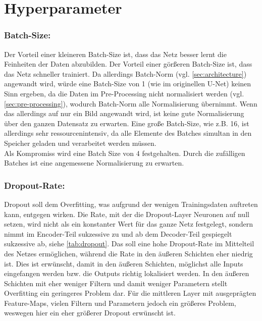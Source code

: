 \section{Hyperparameter}

\subsubsection{Batch-Size:}

Der Vorteil einer kleineren Batch-Size ist, dass das Netz besser lernt die Feinheiten der Daten abzubilden. 
Der Vorteil einer görßeren Batch-Size ist, dass das Netz schneller trainiert. 
Da allerdings Batch-Norm (vgl. \autoref{sec:architecture}) angewandt wird, würde eine Batch-Size von 1 (wie im originellen U-Net) keinen 
Sinn ergeben, da die Daten im Pre-Processing nicht normalisiert werden (vgl. \autoref{sec:pre-processing}), wodurch Batch-Norm alle 
Normalisierung übernimmt. Wenn das allerdings auf nur ein Bild angewandt wird, ist keine gute Normalisierung über den ganzen Datensatz zu erwarten. 
Eine große Batch-Size, wie z.B. 16, ist allerdings sehr ressourcenintensiv, da alle Elemente des Batches simultan in den Speicher geladen und verarbeitet 
werden müssen. \\
Als Kompromiss wird eine Batch Size von 4 festgehalten. Durch die zufälligen Batches ist eine angemessene Normalisierung zu erwarten.

\subsubsection{Dropout-Rate:}

Dropout soll dem Overfitting, was aufgrund der wenigen Trainingsdaten auftreten kann, entgegen wirken. 
Die Rate, mit der die Dropout-Layer Neuronen auf null setzen, wird nicht als ein konstanter Wert für das ganze Netz festgelegt, 
sondern nimmt im Encoder-Teil sukzessive zu und ab dem Decoder-Teil gespiegelt sukzessive ab, siehe \autoref{tab:dropout}. 
Das soll eine hohe Dropout-Rate im Mittelteil des Netzes ermöglichen, während die Rate in den äußeren Schichten eher niedrig ist. 
Dies ist erwünscht, damit in den äußeren Schichten, möglichst alle Inputs eingefangen werden bzw. die Outputs richtig lokalisiert werden. 
In den äußeren Schichten mit eher weniger Filtern und damit weniger Parametern stellt Overfitting ein geringeres Problem dar. 
Für die mittleren Layer mit ausgeprägten Feature-Maps, vielen Filtern und Parametern jedoch ein größeres Problem, weswegen hier ein eher größerer
Dropout erwünscht ist.     

